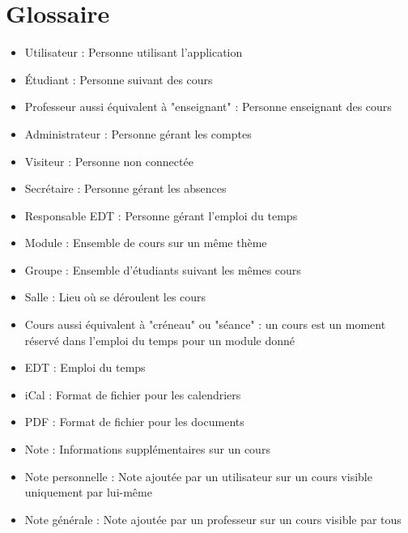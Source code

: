 \documentclass[a4paper,12pt]{article}
\begin{document}
\section{Glossaire}
\begin{itemize}
    \item Utilisateur : Personne utilisant l'application
    \item Étudiant : Personne suivant des cours
    \item Professeur aussi équivalent à "enseignant" : Personne enseignant des cours
    \item Administrateur : Personne gérant les comptes
    \item Visiteur : Personne non connectée
    \item Secrétaire : Personne gérant les absences
    \item Responsable EDT : Personne gérant l'emploi du temps
    \item Module : Ensemble de cours sur un même thème
    \item Groupe : Ensemble d'étudiants suivant les mêmes cours
    \item Salle : Lieu où se déroulent les cours
    \item Cours aussi équivalent à "créneau" ou "séance" : un cours est un moment réservé dans l'emploi du temps pour un module donné
    \item EDT : Emploi du temps
    \item iCal : Format de fichier pour les calendriers
    \item PDF : Format de fichier pour les documents
    \item Note : Informations supplémentaires sur un cours
    \item Note personnelle : Note ajoutée par un utilisateur sur un cours visible uniquement par lui-même
    \item Note générale : Note ajoutée par un professeur sur un cours visible par tous
\end{itemize}
\end{document}
